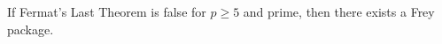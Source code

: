 \begin{lemma}
  \label{FreyPackage.of_not_FermatLastTheorem_p_ge_5}
  \leanok
  If Fermat's Last Theorem is false for $p \ge 5$ and prime, then there exists a Frey package.
\end{lemma}
